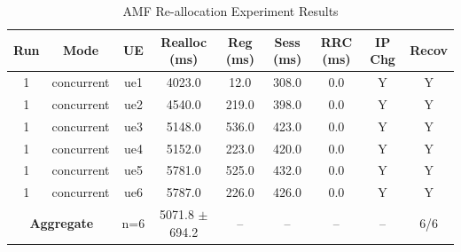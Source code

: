 \begin{table}[ht]
\centering
\begin{tabular}{|c|c|c|c|c|c|c|c|c|}
\hline
Run & Mode & UE & Realloc (ms) & Reg (ms) & Sess (ms) & RRC (ms) & IP Chg & Recov \\
\hline
1 & concurrent & ue1 & 4023.0 & 12.0 & 308.0 & 0.0 & Y & Y \\
1 & concurrent & ue2 & 4540.0 & 219.0 & 398.0 & 0.0 & Y & Y \\
1 & concurrent & ue3 & 5148.0 & 536.0 & 423.0 & 0.0 & Y & Y \\
1 & concurrent & ue4 & 5152.0 & 223.0 & 420.0 & 0.0 & Y & Y \\
1 & concurrent & ue5 & 5781.0 & 525.0 & 432.0 & 0.0 & Y & Y \\
1 & concurrent & ue6 & 5787.0 & 226.0 & 426.0 & 0.0 & Y & Y \\
\multicolumn{2}{|c|}{\textbf{Aggregate}} & n=6 & 5071.8 $\pm$ 694.2 & -- & -- & -- & -- & 6/6 \\
\hline
\end{tabular}
\caption{AMF Re-allocation Experiment Results}
\label{tab:amf_realloc}
\end{table}
